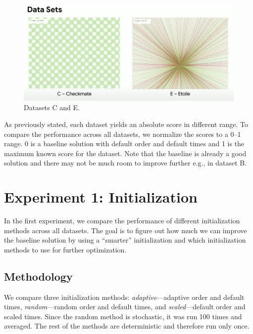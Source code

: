 \begin{figure}
    \centering
    \includegraphics[width=\linewidth]{img/screenshots/hashcode_datasets_c_e.png}
    \caption[Datasets C and E]{
        Datasets C and E\footnotemark.
        }
        \label{fig:hashcode_dataset_c_e}
    \end{figure}
    

\bigskip

As previously stated, each dataset yields an absolute score in different range. To compare the performance across all datasets, we normalize the scores to a 0--1 range. 0 is a baseline solution with default order and default times and 1 is the maximum known score for the dataset. Note that the baseline is already a good solution and there may not be much room to improve further e.g., in dataset B.

\section{Experiment 1: Initialization}

In the first experiment, we compare the performance of different initialization methods across all datasets. The goal is to figure out how much we can improve the baseline solution by using a ``smarter'' initialization and which initialization methods to use for further optimization.

\subsection*{Methodology}

We compare three initialization methods: \textit{adaptive}---adaptive order and default times, \textit{random}---random order and default times, and \textit{scaled}---default order and scaled times. Since the random method is stochastic, it was run 100 times and averaged. The rest of the methods are deterministic and therefore run only once.

